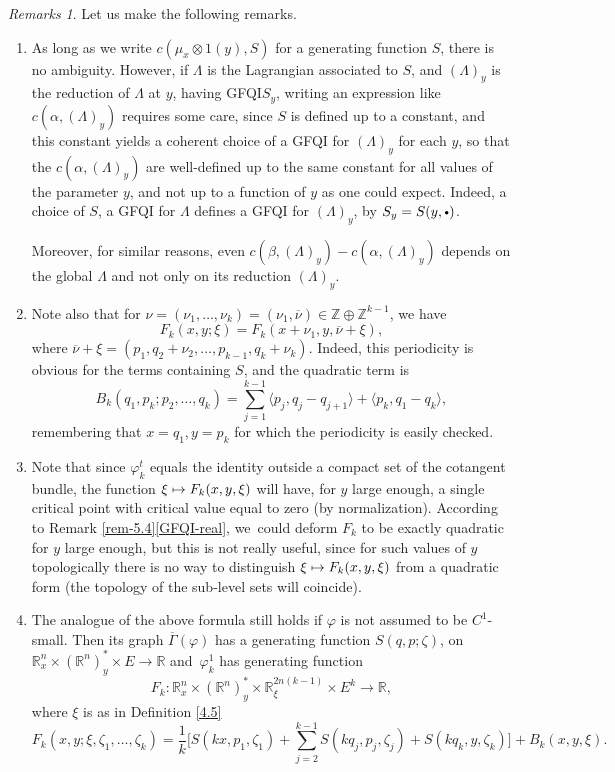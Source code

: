 \documentclass[JEP,XML,SOM,NoFloatCountersInSection,Unicode,published]{cedram}
\newcommand\mto{\mathchoice{\longmapsto}{\mapsto}{\mapsto}{\mapsto}}
\newcommand{\bbullet}{{\scriptscriptstyle\bullet}}
\newcommand{\cbbullet}{{\raisebox{1pt}{$\bbullet$}}}
\numberwithin{equation}{section}
\newcommand{\GFQI}{\textup{GFQI}\xspace}
\theoremstyle{plain}
\theoremstyle{definition}
\theoremstyle{remark}
\newtheorem{remarks}[theorem]{Remarks}
\begin{document}
\begin{remarks} \label{red-normal}
Let us make the following remarks.
\begin{enumerate} \item As long as we write $c(\mu_{x} \otimes 1(y), S)$ for a generating function $S$, there is no ambiguity.
However, if $\Lambda$ is the Lagrangian associated to $S$, and $(\Lambda)_y$ is the reduction of $\Lambda$ at $y$, having \GFQI $S_y$,
writing an expression like $c(\alpha, (\Lambda)_{y})$ requires some care, since $S$ is defined up to a
constant, and this constant yields a coherent choice of a \GFQI for
$(\Lambda)_{y}$ for each $y$, so that the $c(\alpha, (\Lambda)_{y})$ are well-defined up to the same constant for all values of the parameter $y$, and not up to a function of $y$ as one could expect.
Indeed, a choice of $S$, a \GFQI for $\Lambda$ defines a \GFQI for $(\Lambda)_{y}$, by $S_{y}= S(y, \cbbullet)$.

Moreover, for similar reasons, even $c(\beta, (\Lambda)_y)-c(\alpha, (\Lambda)_y)$ depends on the global $\Lambda$ and not only on its reduction $(\Lambda)_y$.

\item Note also that for $\nu=(\nu_{1},\dots,\nu_{k})=(\nu_{1},\overline \nu)\in {\mathbb Z}\oplus {\mathbb Z} ^{k-1}$, we have
\[
F_{k}(x,y;\xi)=F_{k}(x+\nu_{1},y, \overline \nu + \xi),
\]
where $\overline\nu+ \xi=(p_{1},q_{2}+\nu_{2},\dots, p_{k-1},q_{k}+\nu_{k})$. Indeed, this periodicity is obvious for the terms containing $S$, and the quadratic term is
\[
B_k(q_1,p_k;p_2,\dots,q_k)=\sum_{j=1}^{k-1}\langle p_{j}, q_{j}-q_{j+1}\rangle + \langle p_{k},q_{1}-q_{k}\rangle,
\]
remembering that $x=q_{1},y=p_{k}$ for which the periodicity is easily checked.

\item Note that since $\varphi_{k}^{t}$ equals the identity outside a compact set of the cotangent bundle, the function $\xi \mto F_{k}(x,y,\xi)$ will have, for $y$ large enough, a single critical point with critical value equal to zero (by normalization). According to Remark \ref{rem-5.4}\eqref{GFQI-real}, we~could deform $F_{k}$ to be exactly quadratic for $y$ large enough, but this is not really useful, since for such values of $y$ topologically there is no way to distinguish $\xi \mto F_{k}(x,y,\xi)$ from a quadratic form (the topology of the sub-level sets will coincide).

\item \label{red-normal-4} The analogue of the above formula still holds if $\varphi$ is not assumed to be $C^1$-small. Then its graph $\overline \Gamma (\varphi)$ has a generating function $S(q,p;\zeta)$, on $ {\mathbb R}_x^n\times ({\mathbb R}^n)_y^*\times E \to {\mathbb R} $ and~$\varphi_k^1$ has generating function
\[
F_k: {\mathbb R}_x^n\times ({\mathbb R}^n)_y^* \times {\mathbb R}_{\xi}^{2n(k-1)} \times E^k \to {\mathbb R},
\]
where $\xi$ is as in Definition \ref{4.5}
\[
\label{def-F2} F_k(x,y;\xi, \zeta_1,\dots, \zeta_k)
=\frac{1}{k}\biggl [ S(kx,p_{1},\zeta_1)+\! \sum_{j=2}^{k-1} S(kq_{j},p_{j},\zeta_j) + S(kq_{k},y,\zeta_k)\biggr ]\!+\!B_{k}(x,y,\xi).\]
\end{enumerate}
\end{remarks}
\end{document}
